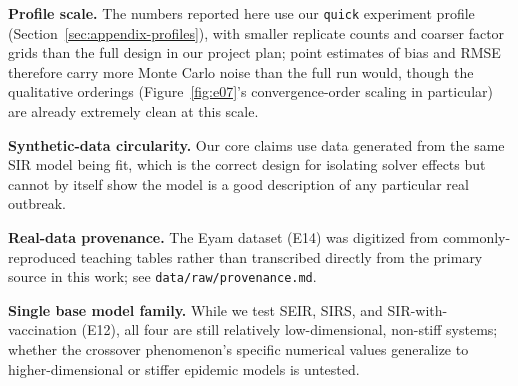 \textbf{Profile scale.} The numbers reported here use our \texttt{quick} experiment profile
(Section~\ref{sec:appendix-profiles}), with smaller replicate counts and coarser factor grids than
the full design in our project plan; point estimates of bias and RMSE therefore carry more Monte
Carlo noise than the full run would, though the qualitative orderings (Figure~\ref{fig:e07}'s
convergence-order scaling in particular) are already extremely clean at this scale.

\textbf{Synthetic-data circularity.} Our core claims use data generated from the same SIR model
being fit, which is the correct design for isolating solver effects but cannot by itself show the
model is a good description of any particular real outbreak.

\textbf{Real-data provenance.} The Eyam dataset (E14) was digitized from commonly-reproduced
teaching tables rather than transcribed directly from the primary source in this work; see
\texttt{data/raw/provenance.md}.

\textbf{Single base model family.} While we test SEIR, SIRS, and SIR-with-vaccination (E12), all
four are still relatively low-dimensional, non-stiff systems; whether the crossover phenomenon's
specific numerical values generalize to higher-dimensional or stiffer epidemic models is untested.
